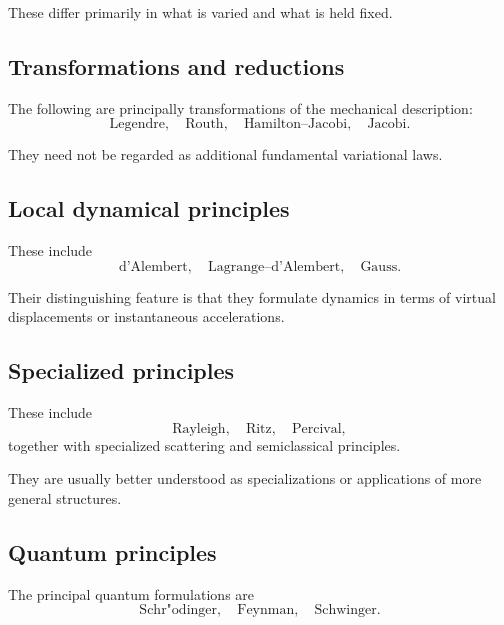 These differ primarily in what is varied and what is held fixed.

\subsection{Transformations and reductions}

The following are principally transformations of the mechanical description:
\begin{equation}
\boxed{
\text{Legendre},\quad
\text{Routh},\quad
\text{Hamilton--Jacobi},\quad
\text{Jacobi}.
}
\end{equation}

They need not be regarded as additional fundamental variational laws.

\subsection{Local dynamical principles}

These include
\begin{equation}
\boxed{
\text{d'Alembert},\quad
\text{Lagrange--d'Alembert},\quad
\text{Gauss}.
}
\end{equation}

Their distinguishing feature is that they formulate dynamics in terms of virtual displacements or instantaneous accelerations.

\subsection{Specialized principles}

These include
\begin{equation}
\boxed{
\text{Rayleigh},\quad
\text{Ritz},\quad
\text{Percival},
}
\end{equation}
together with specialized scattering and semiclassical principles.

They are usually better understood as specializations or applications of more general structures.

\subsection{Quantum principles}

The principal quantum formulations are
\begin{equation}
\boxed{
\text{Schr"odinger},\quad
\text{Feynman},\quad
\text{Schwinger}.
}
\end{equation}

